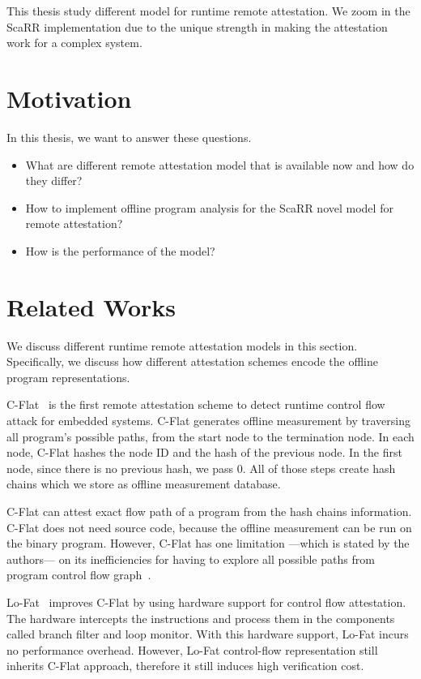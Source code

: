 This thesis study different model for runtime remote attestation. We zoom in the
ScaRR implementation due to the unique strength in making the attestation work
for a complex system.

\section{Motivation}

In this thesis, we want to answer these questions.
\begin{itemize}
    \item What are different remote attestation model that is available now and
    how do they differ?
    \item How to implement offline program analysis for the ScaRR novel model
    for remote attestation?
    \item How is the performance of the model?
\end{itemize}

\section{Related Works}

We discuss different runtime remote attestation models in this section.
Specifically, we discuss how different attestation schemes encode the offline
program representations.

C-Flat~\cite{aberaCFLATControlFlowAttestation2016} is the first remote
attestation scheme to detect runtime control flow attack for embedded systems.
C-Flat generates offline measurement by traversing all program's possible paths,
from the start node to the termination node. In each node, C-Flat hashes the
node ID and the hash of the previous node. In the first node, since there is no
previous hash, we pass 0. All of those steps create hash chains which we store
as offline measurement database.

C-Flat can attest exact flow path of a program from the hash chains information.
C-Flat does not need source code, because the offline measurement can be run on
the binary program. However, C-Flat has one limitation ---which is stated by the
authors--- on its inefficiencies for having to explore all possible paths from
program control flow graph~\cite{aberaCFLATControlFlowAttestation2016}.

Lo-Fat~\cite{dessoukyLOFATLowOverheadControl2017} improves C-Flat by using
hardware support for control flow attestation. The hardware intercepts the
instructions and process them in the components called branch filter and loop
monitor. With this hardware support, Lo-Fat incurs no performance overhead.
However, Lo-Fat control-flow representation still inherits C-Flat approach,
therefore it still induces high verification cost.

